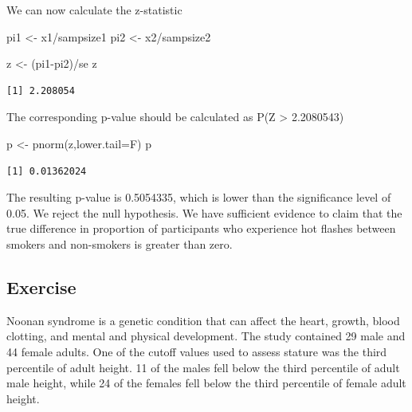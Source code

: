 \documentclass[
  letterpaper,
  DIV=11,
  numbers=noendperiod]{scrartcl}
\newenvironment{Shaded}{\begin{snugshade}}{\end{snugshade}}
\newcommand{\AttributeTok}[1]{\textcolor[rgb]{0.40,0.45,0.13}{#1}}
\newcommand{\FunctionTok}[1]{\textcolor[rgb]{0.28,0.35,0.67}{#1}}
\newcommand{\NormalTok}[1]{\textcolor[rgb]{0.00,0.23,0.31}{#1}}
\newcommand{\OtherTok}[1]{\textcolor[rgb]{0.00,0.23,0.31}{#1}}
\newcommand{\SpecialCharTok}[1]{\textcolor[rgb]{0.37,0.37,0.37}{#1}}
\begin{document}
We can now calculate the z-statistic

\begin{Shaded}
\begin{Highlighting}[]
\NormalTok{pi1 }\OtherTok{\textless{}{-}}\NormalTok{ x1}\SpecialCharTok{/}\NormalTok{sampsize1}
\NormalTok{pi2 }\OtherTok{\textless{}{-}}\NormalTok{ x2}\SpecialCharTok{/}\NormalTok{sampsize2}



\NormalTok{z }\OtherTok{\textless{}{-}}\NormalTok{ (pi1}\SpecialCharTok{{-}}\NormalTok{pi2)}\SpecialCharTok{/}\NormalTok{se}
\NormalTok{z}
\end{Highlighting}
\end{Shaded}

\begin{verbatim}
[1] 2.208054
\end{verbatim}

The corresponding p-value should be calculated as P(Z \textgreater{}
2.2080543)

\begin{Shaded}
\begin{Highlighting}[]
\NormalTok{p }\OtherTok{\textless{}{-}} \FunctionTok{pnorm}\NormalTok{(z,}\AttributeTok{lower.tail=}\NormalTok{F)}
\NormalTok{p}
\end{Highlighting}
\end{Shaded}

\begin{verbatim}
[1] 0.01362024
\end{verbatim}

The resulting p-value is 0.5054335, which is lower than the significance
level of 0.05. We reject the null hypothesis. We have sufficient
evidence to claim that the true difference in proportion of participants
who experience hot flashes between smokers and non-smokers is greater
than zero.

\subsection{Exercise}\label{exercise-6}

Noonan syndrome is a genetic condition that can affect the heart,
growth, blood clotting, and mental and physical development. The study
contained 29 male and 44 female adults. One of the cutoff values used to
assess stature was the third percentile of adult height. 11 of the males
fell below the third percentile of adult male height, while 24 of the
females fell below the third percentile of female adult height.
\end{document}
